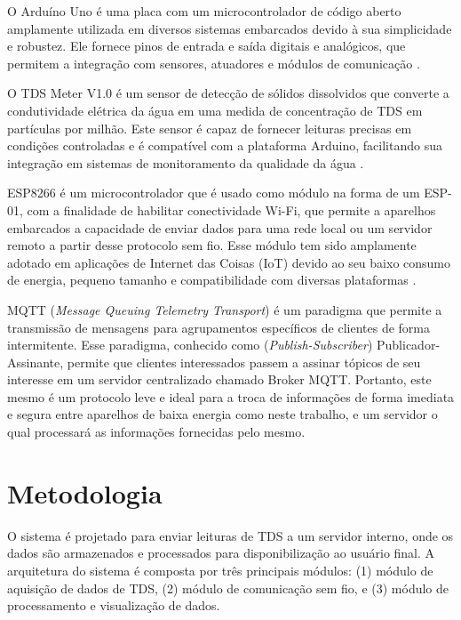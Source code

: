 \documentclass[12pt]{article}
\begin{document}
O Arduíno Uno é uma placa com um microcontrolador de código aberto amplamente utilizada em diversos sistemas embarcados devido à sua simplicidade e robustez. Ele fornece pinos de entrada e saída digitais e analógicos, que permitem a integração com sensores, atuadores e módulos de comunicação \cite{banzi2022getting}.

O TDS Meter V1.0 é um sensor de detecção de sólidos dissolvidos que converte a condutividade elétrica da água em uma medida de concentração de TDS em partículas por milhão. Este sensor é capaz de fornecer leituras precisas em condições controladas e é compatível com a plataforma Arduino,  facilitando sua integração em sistemas de monitoramento da qualidade da água \cite{TDS2020datasheet}.%

ESP8266 é um microcontrolador que é usado como módulo na forma de um ESP-01, com a finalidade de habilitar conectividade Wi-Fi, que permite a aparelhos embarcados a capacidade de enviar dados para uma rede local ou um servidor remoto a partir desse protocolo sem fio. Esse módulo tem sido amplamente adotado em aplicações de Internet das Coisas (IoT) devido ao seu baixo consumo de energia, pequeno tamanho e compatibilidade com diversas plataformas \cite{8502562}. 

MQTT (\textit{Message Queuing Telemetry Transport}) é um paradigma que permite a transmissão de mensagens para agrupamentos específicos de clientes de forma intermitente. Esse paradigma, conhecido como (\textit{Publish-Subscriber}) Publicador-Assinante, permite que clientes interessados passem a assinar tópicos de seu interesse em um servidor centralizado chamado Broker MQTT. Portanto, este mesmo é um protocolo leve e ideal para a troca de informações de forma imediata e segura entre aparelhos de baixa energia como neste trabalho, e um servidor o qual processará as informações fornecidas pelo mesmo. \cite{quincozes2019mqtt}


\section{Metodologia}

O sistema é projetado para enviar leituras de TDS a um servidor interno, onde os dados são armazenados e processados para disponibilização ao usuário final. A arquitetura do sistema é composta por três principais módulos: (1) módulo de aquisição de dados de TDS, (2) módulo de comunicação sem fio, e (3) módulo de processamento e visualização de dados. 
\end{document}
